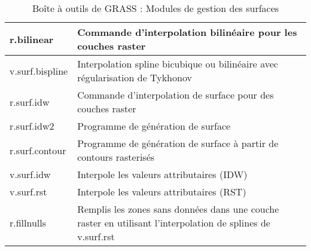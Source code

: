 \begin{table}[H]
\begin{tabular}{|p{4cm}|p{10cm}|}
  \hline r.bilinear & Commande d'interpolation bilinéaire pour les couches raster \\
  \hline v.surf.bispline & Interpolation spline bicubique ou bilinéaire avec régularisation de Tykhonov \\
  \hline r.surf.idw & Commande d'interpolation de surface pour des couches raster\\
  \hline r.surf.idw2 & Programme de génération de surface\\
  \hline r.surf.contour & Programme de génération de surface à partir de contours rasterisés \\
  \hline v.surf.idw & Interpole les valeurs attributaires (IDW) \\
  \hline v.surf.rst & Interpole les valeurs attributaires (RST) \\
  \hline r.fillnulls & Remplis les zones sans données dans une couche raster en utilisant l'interpolation de splines de v.surf.rst \\
\hline
\end{tabular}
\caption{Boîte à outils de GRASS : Modules de gestion des surfaces}
\end{table}

